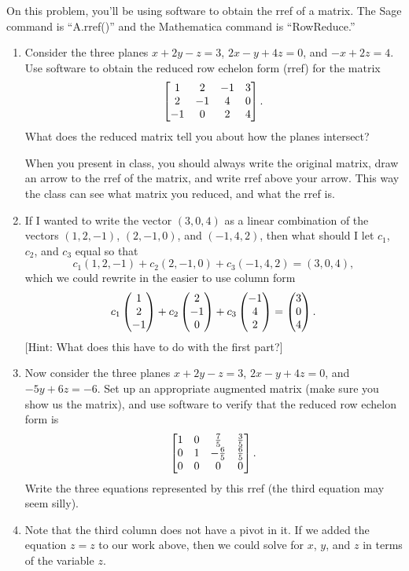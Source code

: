 \begin{problem}
On this problem, you'll be using software to obtain the rref of a matrix.  The Sage command is ``A.rref()'' and the Mathematica command is ``RowReduce.'' 
%
\begin{enumerate}
 \item 
Consider the three planes $x+2y-z=3$, $2x-y+4z=0$, and $-x+2z=4$.  
Use software to obtain the reduced row echelon form (rref) for the matrix
$$
\begin{bmatrix} 
1&2&-1&3\\
2&-1&4&0\\
-1&0&2&4
 \end{bmatrix}.
$$  
What does the reduced matrix tell you about how the planes intersect?

When you present in class, you should always write the original matrix, draw an arrow to the rref of the matrix, and write rref above your arrow. This way the class can see what matrix you reduced, and what the rref is. 
 \item
If I wanted to write the vector $(3,0,4)$ as a linear combination of the vectors $(1,2,-1)$, $(2,-1,0)$, and $(-1,4,2)$, then what should I let $c_1$, $c_2$, and $c_3$ equal so that 
$$ c_1(1,2,-1)+c_2(2,-1,0)+c_3(-1,4,2)=(3,0,4),$$ 
which we could rewrite in the easier to use column form
$$ c_1\begin{pmatrix} 1\\2\\-1 \end{pmatrix}+c_2\begin{pmatrix} 2\\-1\\0 \end{pmatrix}+c_3\begin{pmatrix} -1\\4\\2 \end{pmatrix}=\begin{pmatrix} 3\\0\\4 \end{pmatrix}.$$
[Hint: What does this have to do with the first part?] 
 \item
Now consider the three planes $x+2y-z=3$, $2x-y+4z=0$, and $-5y+6z=-6$.  
Set up an appropriate augmented matrix (make sure you show us the matrix), and use software to verify that the reduced row echelon form is
$$
\begin{bmatrix} 
1 & 0 & \frac{7}{5} & \frac{3}{5} \\
0 & 1 & -\frac{6}{5} & \frac{6}{5} \\
0 & 0 & 0 & 0
 \end{bmatrix}.
$$
Write the three equations represented by this rref (the third equation may seem silly). 
\item Note that the third column does not have a pivot in it. If we added the equation $z=z$ to our work above, then we could solve for $x$, $y$, and $z$ in terms of the variable $z$. 

\end{enumerate}
\end{problem}
